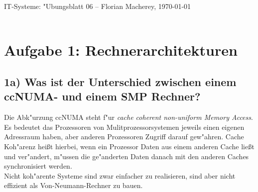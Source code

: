 \documentclass{scrartcl}
\begin{document}
{\Large \centering \textsf{IT-Systeme: "Ubungsblatt 06} -- Florian Macherey, 
\today}\\
\noindent\makebox[\linewidth]{\rule{\textwidth}{0.2pt}} \\


\section*{Aufgabe 1: Rechnerarchitekturen}
\subsection*{1a) Was ist der Unterschied zwischen einem ccNUMA- und 
einem SMP Rechner?}
Die Abk"urzung ccNUMA steht f"ur \textit{cache coherent non-uniform 
Memory 
Access}. Es bedeutet das Prozessoren von Mulitprozessorsystemen jeweils 
einen 
eigenen Adressraum haben, aber anderen Prozessoren Zugriff darauf 
gew"ahren. 
Cache Koh"arenz hei\ss t hierbei, wenn ein Prozessor Daten aus einem 
anderen 
Cache lie\ss t und ver"andert, m"ussen die ge"anderten Daten danach mit 
den 
anderen Caches synchronisiert werden. \\
Nicht koh"arente Systeme sind zwar 
einfacher zu realisieren, sind aber nicht effizient als Von-Neumann-Rechner 
zu 
bauen. 
\end{document}
